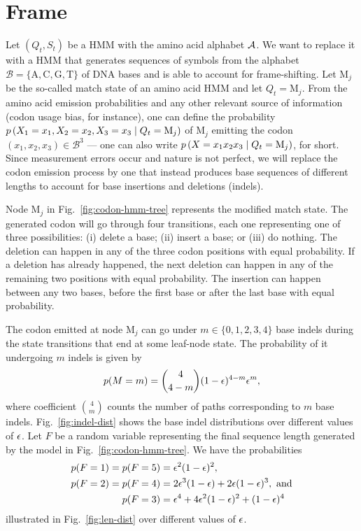 \section{Frame}

Let $(Q_t, S_t)$ be a HMM with the amino acid alphabet $\mathcal{A}$.
We want to replace it with a HMM that generates sequences of symbols from the alphabet
$\mathcal B = \{\mathrm A, \mathrm C, \mathrm G, \mathrm T\}$ of DNA bases and is able to account
for frame-shifting.
Let $\mathrm M_j$ be the so-called match state of an amino acid HMM and let $Q_t=\mathrm M_j$.
From the amino acid emission probabilities and any other relevant source of information
(codon usage bias, for instance), one can define the probability $p\left(X_1=x_1, X_2=x_2, X_3=x_3\;\middle|\; Q_t=\mathrm M_j\right)$
of $\mathrm M_j$ emitting the codon $(x_1, x_2, x_3) \in \mathcal B^3$
--- one can also write $p\left(X=x_1x_2x_3\;\middle|\; Q_t=\mathrm M_j\right)$, for short.
Since measurement errors occur and nature is not perfect, we will replace the
codon emission process by one that instead produces base sequences of different
lengths to account for base insertions and deletions (indels).

Node $\mathrm M_j$ in Fig.~\ref{fig:codon-hmm-tree} represents the modified match state.
The generated codon will go through four transitions, each one representing one of three possibilities: (i) delete a base; (ii) insert a base; or (iii) do nothing.
The deletion can happen in any of the three codon positions with equal probability.
If a deletion has already happened, the next deletion can happen in any of the remaining two positions with equal probability.
The insertion can happen between any two bases, before the first base or after the last base with equal probability.

The codon emitted at node $\mathrm M_j$ can go under $m\in\{0, 1, 2, 3, 4\}$ base indels during
the state transitions that end at some leaf-node state.
The probability of it undergoing $m$ indels is given by
\begin{equation*}
  p(M=m) = \binom{4}{4-m} (1 - \epsilon)^{4-m} \epsilon^m,
\end{equation*}
where coefficient $\binom{4}{m}$ counts the number of paths corresponding to $m$ base indels.
Fig.~\ref{fig:indel-dist} shows the base indel distributions over different values of $\epsilon$.
Let $F$ be a random variable representing the final sequence length generated by the model in
Fig.~\ref{fig:codon-hmm-tree}.
We have the probabilities
\begin{equation*}
  \begin{split}
    p(F=1) = p(F=5) &= \epsilon^2(1-\epsilon)^2, \\
    p(F=2) = p(F=4) &= 2\epsilon^3(1-\epsilon) + 2\epsilon(1-\epsilon)^3,~\text{and} \\
    p(F=3)          &= \epsilon^4 + 4\epsilon^2(1-\epsilon)^2 + (1-\epsilon)^4
  \end{split}
\end{equation*}
illustrated in Fig.~\ref{fig:len-dist} over different values of $\epsilon$.

